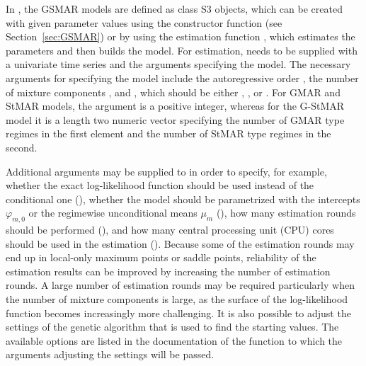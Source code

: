 \documentclass[nojss]{jss} %
\begin{document}
In , the GSMAR models are defined as class  S3 objects, which can be created with given parameter values using the constructor function  (see Section~\ref{sec:GSMAR}) or by using the estimation function , which estimates the parameters and then builds the model. For estimation,  needs to be supplied with a univariate time series and the arguments specifying the model. The necessary arguments for specifying the model include the autoregressive order , the number of mixture components , and , which should be either , , or . For GMAR and StMAR models, the argument  is a positive integer, whereas for the G-StMAR model it is a length two numeric vector specifying the number of GMAR type regimes in the first element and the number of StMAR type regimes in the second.

Additional arguments may be supplied to  in order to specify, for example, whether the exact log-likelihood function should be used instead of the conditional one (), whether the model should be parametrized with the intercepts $\varphi_{m,0}$ or the regimewise unconditional means $\mu_m$ (), how many estimation rounds should be performed (), and how many central processing unit (CPU) cores should be used in the estimation (). Because some of the estimation rounds may end up in local-only maximum points or saddle points, reliability of the estimation results can be improved by increasing the number of estimation rounds. A large number of estimation rounds may be required particularly when the number of mixture components is large, as the surface of the log-likelihood function becomes increasingly more challenging. It is also possible to adjust the settings of the genetic algorithm that is used to find the starting values. The available options are listed in the documentation of the function  to which the arguments adjusting the settings will be passed.
\end{document}
